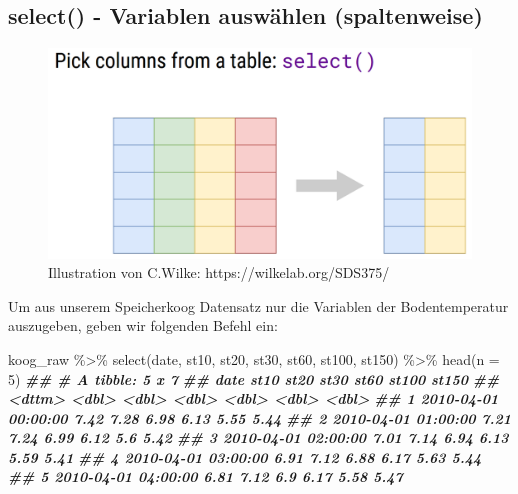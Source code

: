 \documentclass[
]{article}
\newenvironment{Shaded}{\begin{snugshade}}{\end{snugshade}}
\newcommand{\AttributeTok}[1]{\textcolor[rgb]{0.77,0.63,0.00}{#1}}
\newcommand{\DecValTok}[1]{\textcolor[rgb]{0.00,0.00,0.81}{#1}}
\newcommand{\DocumentationTok}[1]{\textcolor[rgb]{0.56,0.35,0.01}{\textbf{\textit{#1}}}}
\newcommand{\FunctionTok}[1]{\textcolor[rgb]{0.00,0.00,0.00}{#1}}
\newcommand{\NormalTok}[1]{#1}
\newcommand{\SpecialCharTok}[1]{\textcolor[rgb]{0.00,0.00,0.00}{#1}}
\begin{document}
\hypertarget{select---variablen-auswuxe4hlen-spaltenweise}{%
\subsection{select() - Variablen auswählen (spaltenweise)}\label{select---variablen-auswuxe4hlen-spaltenweise}}

\begin{figure}

{\centering \includegraphics[width=1\linewidth]{images/037} 

}

\caption{Illustration von C.Wilke: https://wilkelab.org/SDS375/}\label{fig:unnamed-chunk-125}
\end{figure}

Um aus unserem Speicherkoog Datensatz nur die Variablen der Bodentemperatur auszugeben, geben wir folgenden Befehl ein:

\begin{Shaded}
\begin{Highlighting}[]
\NormalTok{koog\_raw }\SpecialCharTok{\%\textgreater{}\%}
  \FunctionTok{select}\NormalTok{(date, st10, st20, st30, st60, st100, st150) }\SpecialCharTok{\%\textgreater{}\%}
  \FunctionTok{head}\NormalTok{(}\AttributeTok{n =} \DecValTok{5}\NormalTok{)}
\DocumentationTok{\#\# \# A tibble: 5 x 7}
\DocumentationTok{\#\#   date                 st10  st20  st30  st60 st100 st150}
\DocumentationTok{\#\#   \textless{}dttm\textgreater{}              \textless{}dbl\textgreater{} \textless{}dbl\textgreater{} \textless{}dbl\textgreater{} \textless{}dbl\textgreater{} \textless{}dbl\textgreater{} \textless{}dbl\textgreater{}}
\DocumentationTok{\#\# 1 2010{-}04{-}01 00:00:00  7.42  7.28  6.98  6.13  5.55  5.44}
\DocumentationTok{\#\# 2 2010{-}04{-}01 01:00:00  7.21  7.24  6.99  6.12  5.6   5.42}
\DocumentationTok{\#\# 3 2010{-}04{-}01 02:00:00  7.01  7.14  6.94  6.13  5.59  5.41}
\DocumentationTok{\#\# 4 2010{-}04{-}01 03:00:00  6.91  7.12  6.88  6.17  5.63  5.44}
\DocumentationTok{\#\# 5 2010{-}04{-}01 04:00:00  6.81  7.12  6.9   6.17  5.58  5.47}
\end{Highlighting}
\end{Shaded}
\end{document}
